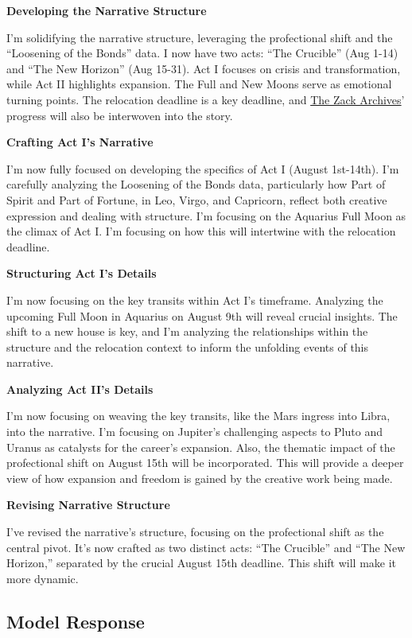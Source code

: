 \documentclass{article}
\begin{document}
\textbf{Developing the Narrative Structure}

I'm solidifying the narrative structure, leveraging the profectional shift and the ``Loosening of the Bonds'' data. I now have two acts: ``The Crucible'' (Aug 1-14) and ``The New Horizon'' (Aug 15-31). Act I focuses on crisis and transformation, while Act II highlights expansion. The Full and New Moons serve as emotional turning points. The relocation deadline is a key deadline, and \hyperlink{gloss:the_zack_archives}{The Zack Archives}' progress will also be interwoven into the story.

\textbf{Crafting Act I's Narrative}

I'm now fully focused on developing the specifics of Act I (August 1st-14th). I'm carefully analyzing the Loosening of the Bonds data, particularly how Part of Spirit and Part of Fortune, in Leo, Virgo, and Capricorn, reflect both creative expression and dealing with structure. I'm focusing on the Aquarius Full Moon as the climax of Act I. I'm focusing on how this will intertwine with the relocation deadline.

\textbf{Structuring Act I's Details}

I'm now focusing on the key transits within Act I's timeframe. Analyzing the upcoming Full Moon in Aquarius on August 9th will reveal crucial insights. The shift to a new house is key, and I'm analyzing the relationships within the structure and the relocation context to inform the unfolding events of this narrative.

\textbf{Analyzing Act II's Details}

I'm now focusing on weaving the key transits, like the Mars ingress into Libra, into the narrative. I'm focusing on Jupiter's challenging aspects to Pluto and Uranus as catalysts for the career's expansion. Also, the thematic impact of the profectional shift on August 15th will be incorporated. This will provide a deeper view of how expansion and freedom is gained by the creative work being made.

\textbf{Revising Narrative Structure}

I've revised the narrative's structure, focusing on the profectional shift as the central pivot. It's now crafted as two distinct acts: ``The Crucible'' and ``The New Horizon,'' separated by the crucial August 15th deadline. This shift will make it more dynamic.

\subsection*{Model Response}\label{model-response}
\end{document}
